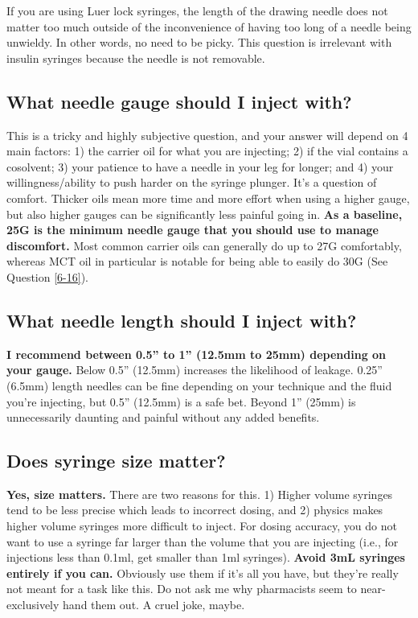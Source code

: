 \documentclass{article}
\begin{document}
If you are using Luer lock syringes, the length of the drawing needle does not matter too much outside of the inconvenience of having too long of a needle being unwieldy. In other words, no need to be picky. This question is irrelevant with insulin syringes because the needle is not removable.

\subsection{What needle gauge should I inject with?}\label{5-16}

This is a tricky and highly subjective question, and your answer will depend on 4 main factors: 1) the carrier oil for what you are injecting; 2) if the vial contains a cosolvent; 3) your patience to have a needle in your leg for longer; and 4) your willingness/ability to push harder on the syringe plunger. It’s a question of comfort. Thicker oils mean more time and more effort when using a higher gauge, but also higher gauges can be significantly less painful going in. \textbf{As a baseline, 25G is the minimum needle gauge that you should use to manage discomfort. }Most common carrier oils can generally do up to 27G comfortably, whereas MCT oil in particular is notable for being able to easily do 30G (See Question \ref{6-16}).

\subsection{What needle length should I inject with?}

\textbf{I recommend between 0.5” to 1” (12.5mm to 25mm) depending on your gauge.} Below 0.5” (12.5mm) increases the likelihood of leakage. 0.25” (6.5mm) length needles can be fine depending on your technique and the fluid you’re injecting, but 0.5” (12.5mm) is a safe bet. Beyond 1” (25mm) is unnecessarily daunting and painful without any added benefits.

\subsection{Does syringe size matter?}

\textbf{Yes, size matters.} There are two reasons for this. 1) Higher volume syringes tend to be less precise which leads to incorrect dosing, and 2) physics makes higher volume syringes more difficult to inject. For dosing accuracy, you do not want to use a syringe far larger than the volume that you are injecting (i.e., for injections less than 0.1ml, get smaller than 1ml syringes). \textbf{Avoid 3mL syringes entirely if you can.} Obviously use them if it’s all you have, but they’re really not meant for a task like this. Do not ask me why pharmacists seem to near-exclusively hand them out. A cruel joke, maybe.
\end{document}
